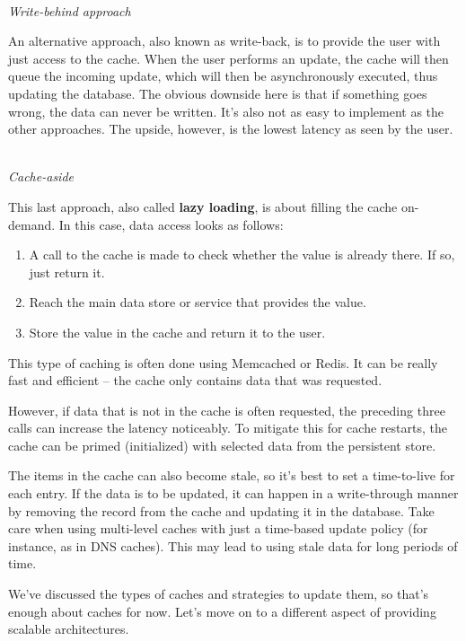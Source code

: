 \hspace*{\fill} \\ %
\noindent
\textit{Write-behind approach}

An alternative approach, also known as write-back, is to provide the user with just access to the cache. When the user performs an update, the cache will then queue the incoming update, which will then be asynchronously executed, thus updating the database. The obvious downside here is that if something goes wrong, the data can never be written. It's also not as easy to implement as the other approaches. The upside, however, is the lowest latency as seen by the user.


\hspace*{\fill} \\ %
\noindent
\textit{Cache-aside}

This last approach, also called \textbf{lazy loading}, is about filling the cache on-demand. In this case, data access looks as follows:


\begin{enumerate}
\item 
A call to the cache is made to check whether the value is already there. If so, just return it.

\item 
Reach the main data store or service that provides the value.

\item
Store the value in the cache and return it to the user.

\end{enumerate}

This type of caching is often done using Memcached or Redis. It can be really fast and efficient – the cache only contains data that was requested.

However, if data that is not in the cache is often requested, the preceding three calls can increase the latency noticeably. To mitigate this for cache restarts, the cache can be primed (initialized) with selected data from the persistent store.

The items in the cache can also become stale, so it's best to set a time-to-live for each entry. If the data is to be updated, it can happen in a write-through manner by removing the record from the cache and updating it in the database. Take care when using multi-level caches with just a time-based update policy (for instance, as in DNS caches). This may lead to using stale data for long periods of time.

We've discussed the types of caches and strategies to update them, so that's enough about caches for now. Let's move on to a different aspect of providing scalable architectures.







